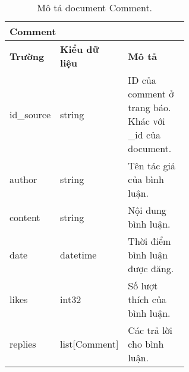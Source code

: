 \begin{table}[ht!]
    \centering
\begin{tabular}{|llp{0.6\linewidth}|}
\hline
\multicolumn{3}{|l|}{\textbf{Comment}}                                                                                                         \\ \hline
\multicolumn{1}{|l|}{\textbf{Trường}} & \multicolumn{1}{l|}{\textbf{Kiểu dữ liệu}} & \textbf{Mô   tả}                                          \\ \hline
\multicolumn{1}{|l|}{id\_source}      & \multicolumn{1}{l|}{string}                & ID   của comment ở trang báo. Khác với \_id của document. \\ \hline
\multicolumn{1}{|l|}{author}          & \multicolumn{1}{l|}{string}                & Tên   tác giả của bình luận.                              \\ \hline
\multicolumn{1}{|l|}{content}         & \multicolumn{1}{l|}{string}                & Nội   dung bình luận.                                     \\ \hline
\multicolumn{1}{|l|}{date}            & \multicolumn{1}{l|}{datetime}              & Thời   điểm bình luận được đăng.                          \\ \hline
\multicolumn{1}{|l|}{likes}           & \multicolumn{1}{l|}{int32}                 & Số   lượt thích của bình luận.                            \\ \hline
\multicolumn{1}{|l|}{replies}         & \multicolumn{1}{l|}{list{[}Comment{]}}     & Các   trả lời cho bình luận.                              \\ \hline
\end{tabular}
    \caption{Mô tả document Comment.}
    \label{table:schema-comment}
\end{table}


